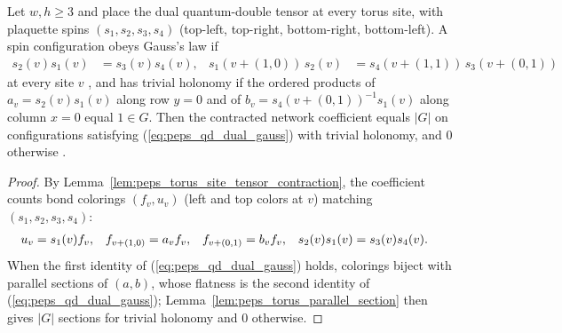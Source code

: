 









\begin{lemma}%
    \label{thm:peps_quantum_double_dual_gauss_law}
    \leanok
    Let $w,h\ge3$ and place the dual quantum-double tensor at every torus site, with plaquette spins $(s_1,s_2,s_3,s_4)$ (top-left, top-right, bottom-right, bottom-left). A spin configuration obeys Gauss's law if
    \begin{align}
        s_2(v)s_1(v)         & =s_3(v)s_4(v),              &
        s_1(v+(1,0))\,s_2(v) & =s_4(v+(1,1))\,s_3(v+(0,1))
        \label{eq:peps_qd_dual_gauss}
    \end{align}
    at every site $v$ \cite[Section~``Examples'', ``The double models'']{Schuch2010PEPS}, and has trivial holonomy if the ordered products of $a_v=s_2(v)s_1(v)$ along row $y=0$ and of $b_v=s_4(v+(0,1))^{-1}s_1(v)$ along column $x=0$ equal $1\in G$. Then the contracted network coefficient equals $|G|$ on configurations satisfying (\ref{eq:peps_qd_dual_gauss}) with trivial holonomy, and $0$ otherwise \cite{gap:rmp_peps_quantum_double_g_isometry}.
\end{lemma}

\begin{proof}\leanok
    By Lemma~\ref{lem:peps_torus_site_tensor_contraction}, the coefficient counts bond colorings $(f_v,u_v)$ (left and top colors at $v$) matching $(s_1,s_2,s_3,s_4)$:
    \begin{align}
        u_v          & =s_1(v)f_v,    &
        f_{v+(1,0)}  & =a_vf_v,       &
        f_{v+(0,1)}  & =b_vf_v,       &
        s_2(v)s_1(v) & =s_3(v)s_4(v).
        \notag
    \end{align}
    When the first identity of (\ref{eq:peps_qd_dual_gauss}) holds, colorings biject with parallel sections of $(a,b)$, whose flatness is the second identity of (\ref{eq:peps_qd_dual_gauss}); Lemma~\ref{lem:peps_torus_parallel_section} then gives $|G|$ sections for trivial holonomy and $0$ otherwise.
\end{proof}

